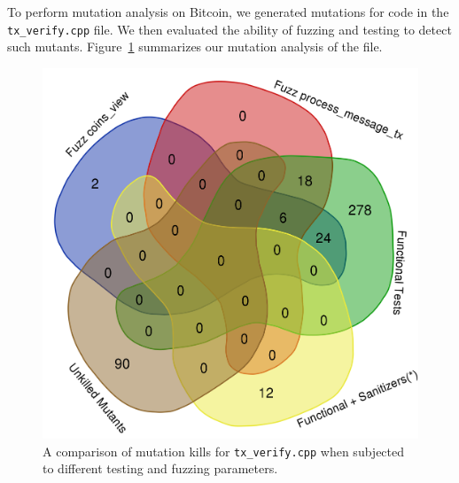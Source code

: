 \begin{sloppypar}

To perform mutation analysis on Bitcoin, we generated mutations for code in the
{\tt tx\_verify.cpp} file. We then evaluated the ability of fuzzing and testing
to detect such mutants. Figure~\ref{kills} summarizes our mutation
analysis of the file.

\begin{figure}
\vspace{2mm}
\includegraphics[width=0.9\columnwidth]{kill_pre_valgrind.png}
\caption{A comparison of mutation kills for {\tt tx\_verify.cpp} when subjected to different testing and fuzzing parameters.}
\label{kills}
\end{figure}


\end{sloppypar}
